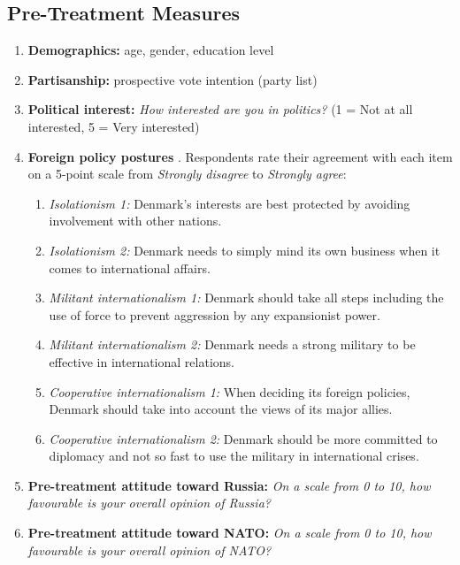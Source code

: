 \subsection{Pre-Treatment Measures}

\begin{enumerate}
    \item \textbf{Demographics:} age, gender, education level
    \item \textbf{Partisanship:} prospective vote intention (party list)
    \item \textbf{Political interest:} \textit{How interested are you in politics?} (1 = Not at all interested, 5 = Very interested)
    \item \textbf{Foreign policy postures} \autocite{rathbun_towards_2020}. Respondents rate their agreement with each item on a 5-point scale from \textit{Strongly disagree} to \textit{Strongly agree}:
    \begin{enumerate}
        \item \textit{Isolationism 1:} Denmark's interests are best protected by avoiding involvement with other nations.
        \item \textit{Isolationism 2:} Denmark needs to simply mind its own business when it comes to international affairs.
        \item \textit{Militant internationalism 1:} Denmark should take all steps including the use of force to prevent aggression by any expansionist power.
        \item \textit{Militant internationalism 2:} Denmark needs a strong military to be effective in international relations.
        \item \textit{Cooperative internationalism 1:} When deciding its foreign policies, Denmark should take into account the views of its major allies.
        \item \textit{Cooperative internationalism 2:} Denmark should be more committed to diplomacy and not so fast to use the military in international crises.
    \end{enumerate}
    \item \textbf{Pre-treatment attitude toward Russia:} \textit{On a scale from 0 to 10, how favourable is your overall opinion of Russia?}
    \item \textbf{Pre-treatment attitude toward NATO:} \textit{On a scale from 0 to 10, how favourable is your overall opinion of NATO?}
\end{enumerate}


